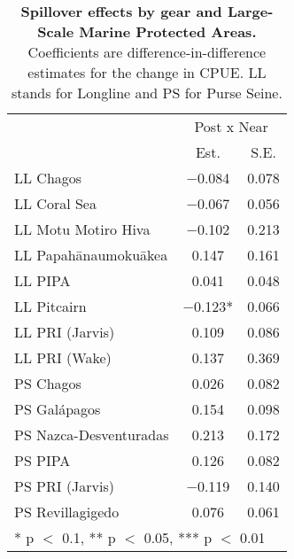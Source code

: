 \begin{table}

\caption{\label{tab:mpa_reg}\textbf{Spillover effects by gear and Large-Scale Marine Protected Areas.} Coefficients are
             difference-in-difference estimates for the change in CPUE. LL stands for Longline and PS for Purse Seine.}
\centering
\begin{tabular}[t]{lcc}
\toprule
\multicolumn{1}{c}{ } & \multicolumn{2}{c}{Post x Near} \\
\cmidrule(l{3pt}r{3pt}){2-3}
  & Est. & S.E.\\
\midrule
LL Chagos & \num{-0.084} & \num{0.078}\\
LL Coral Sea & \num{-0.067} & \num{0.056}\\
LL Motu Motiro Hiva & \num{-0.102} & \num{0.213}\\
LL Papahānaumokuākea & \num{0.147} & \num{0.161}\\
LL PIPA & \num{0.041} & \num{0.048}\\
LL Pitcairn & \num{-0.123}* & \num{0.066}\\
LL PRI (Jarvis) & \num{0.109} & \num{0.086}\\
LL PRI (Wake) & \num{0.137} & \num{0.369}\\
PS Chagos & \num{0.026} & \num{0.082}\\
PS Galápagos & \num{0.154} & \num{0.098}\\
PS Nazca-Desventuradas & \num{0.213} & \num{0.172}\\
PS PIPA & \num{0.126} & \num{0.082}\\
PS PRI (Jarvis) & \num{-0.119} & \num{0.140}\\
PS Revillagigedo & \num{0.076} & \num{0.061}\\
\bottomrule
\multicolumn{3}{l}{\rule{0pt}{1em}* p $<$ 0.1, ** p $<$ 0.05, *** p $<$ 0.01}\\
\end{tabular}
\end{table}
